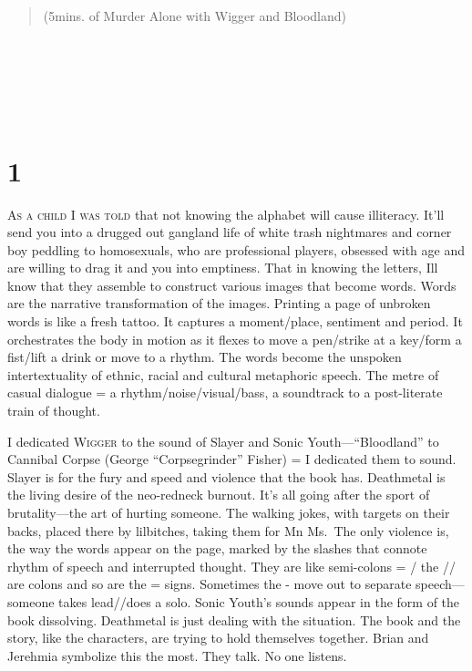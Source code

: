 \documentclass[
]{memoir}
\begin{document}
\begin{verse}
(5mins. of Murder Alone with Wigger and Bloodland)\\
\end{verse}

~

~

~

\hypertarget{section}{%
\section*{1}\label{section}}

\lettrine[lines=3, findent=0em, nindent=0.1em, lhang=0]{A}{s a child I was told}
that not knowing the alphabet will cause illiteracy. It'll send you into
a drugged out gangland life of white trash nightmares and corner boy
peddling to homosexuals, who are professional players, obsessed with age
and are willing to drag it and you into emptiness. That in knowing the
letters, Ill know that they assemble to construct various images that
become words. Words are the narrative transformation of the images.
Printing a page of unbroken words is like a fresh tattoo. It captures a
moment/place, sentiment and period. It orchestrates the body in motion
as it flexes to move a pen/strike at a key/form a fist/lift a drink or
move to a rhythm. The words become the unspoken intertextuality of
ethnic, racial and cultural metaphoric speech. The metre of casual
dialogue = a rhythm/noise/visual/bass, a soundtrack to a post-literate
train of thought.

I dedicated \textsc{Wigger} to the sound of Slayer and Sonic
Youth---``Bloodland'' to Cannibal Corpse (George ``Corpsegrinder''
Fisher) = I dedicated them to sound. Slayer is for the fury and speed
and violence that the book has. Deathmetal is the living desire of the
neo-redneck burnout. It's all going after the sport of brutality---the
art of hurting someone. The walking jokes, with targets on their backs,
placed there by lilbitches, taking them for Mn Ms.~The only violence is,
the way the words appear on the page, marked by the slashes that connote
rhythm of speech and interrupted thought. They are like semi-colons = /
the // are colons and so are the = signs. Sometimes the - move out to
separate speech---someone takes lead//does a solo. Sonic Youth's sounds
appear in the form of the book dissolving. Deathmetal is just dealing
with the situation. The book and the story, like the characters, are
trying to hold themselves together. Brian and Jerehmia symbolize this
the most. They talk. No one listens.
\end{document}
